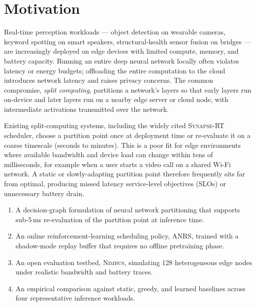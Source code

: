 \section{Motivation}

Real-time perception workloads --- object detection on wearable cameras, keyword spotting on smart speakers, structural-health sensor fusion on bridges --- are increasingly deployed on edge devices with limited compute, memory, and battery capacity. Running an entire deep neural network locally often violates latency or energy budgets; offloading the entire computation to the cloud introduces network latency and raises privacy concerns. The common compromise, \emph{split computing}, partitions a network's layers so that early layers run on-device and later layers run on a nearby edge server or cloud node, with intermediate activations transmitted over the network.

Existing split-computing systems, including the widely cited \textsc{Synapse-RT} scheduler, choose a partition point once at deployment time or re-evaluate it on a coarse timescale (seconds to minutes). This is a poor fit for edge environments where available bandwidth and device load can change within tens of milliseconds, for example when a user starts a video call on a shared Wi-Fi network. A static or slowly-adapting partition point therefore frequently sits far from optimal, producing missed latency service-level objectives (SLOs) or unnecessary battery drain.

\begin{contribbox}
\begin{enumerate}[leftmargin=1.4em,itemsep=2pt]
  \item A decision-graph formulation of neural network partitioning that supports sub-5\,ms re-evaluation of the partition point at inference time.
  \item An online reinforcement-learning scheduling policy, ANRS, trained with a shadow-mode replay buffer that requires no offline pretraining phase.
  \item An open evaluation testbed, \textsc{Nimbus}, simulating 128 heterogeneous edge nodes under realistic bandwidth and battery traces.
  \item An empirical comparison against static, greedy, and learned baselines across four representative inference workloads.
\end{enumerate}
\end{contribbox}
